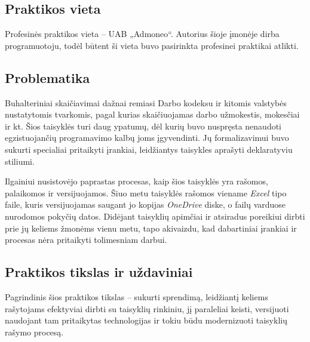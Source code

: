 
\subsection*{Praktikos vieta}

Profesinės praktikos vieta -- UAB „Admoneo“. Autorius šioje įmonėje dirba programuotoju, todėl būtent ši vieta buvo pasirinkta profesinei praktikai atlikti.

\subsection*{Problematika}

Buhalteriniai skaičiavimai dažnai remiasi Darbo kodeksu ir kitomis valstybės nustatytomis tvarkomis, pagal kurias skaičiuojamas darbo užmokestis, mokesčiai ir kt. Šios taisyklės turi daug ypatumų, dėl kurių buvo nuspręsta nenaudoti egzistuojančių programavimo kalbų joms įgyvendinti. Jų formalizavimui buvo sukurti specialiai pritaikyti įrankiai, leidžiantys taisykles aprašyti deklaratyviu stiliumi.

Ilgainiui nusistovėjo paprastas procesas, kaip šios taisyklės yra rašomos, palaikomos ir versijuojamos. Šiuo metu taisyklės rašomos viename \textit{Excel} tipo faile, kuris versijuojamas saugant jo kopijas \textit{OneDrive} diske, o failų varduose nurodomos pokyčių datos. Didėjant taisyklių apimčiai ir atsiradus poreikiui dirbti prie jų keliems žmonėms vienu metu, tapo akivaizdu, kad dabartiniai įrankiai ir procesas nėra pritaikyti tolimesniam darbui.

\subsection*{Praktikos tikslas ir uždaviniai}

Pagrindinis šios praktikos tikslas – sukurti sprendimą, leidžiantį keliems rašytojams efektyviai dirbti su taisyklių rinkiniu, jį paraleliai keisti, versijuoti naudojant tam pritaikytas technologijas ir tokiu būdu modernizuoti taisyklių rašymo procesą. 

